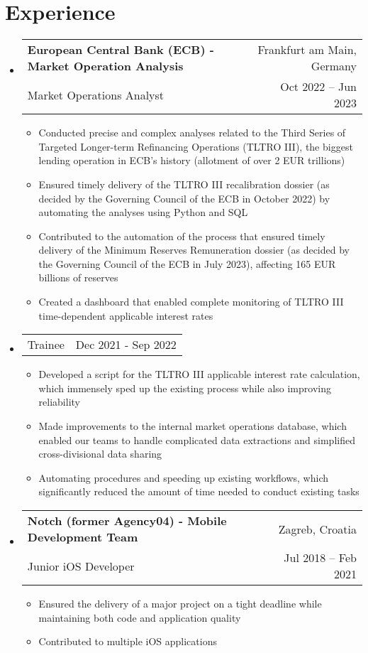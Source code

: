 \documentclass[letterpaper,11pt]{article}
\makeatletter
\newcommand{\resumeItem}[1]{
  \item\small{
    {#1 \vspace{-2pt}}
  }
}
\newcommand{\resumeSubheading}[4]{
  \vspace{-2pt}\item
    \begin{tabular*}{0.97\textwidth}[t]{l@{\extracolsep{\fill}}r}
      \textbf{#1} & #2 \\
      \small #3 & \small #4 \\
    \end{tabular*}\vspace{-7pt}
}
\newcommand{\resumeSubSubheading}[2]{
    \item
    \begin{tabular*}{0.97\textwidth}{l@{\extracolsep{\fill}}r}
      \small#1 & \small #2 \\
    \end{tabular*}\vspace{-7pt}
}
\newcommand{\resumeSubHeadingListStart}{\begin{itemize}[leftmargin=0.15in, label={}]}
\newcommand{\resumeSubHeadingListEnd}{\end{itemize}}
\newcommand{\resumeItemListStart}{\begin{itemize}}
\newcommand{\resumeItemListEnd}{\end{itemize}\vspace{-5pt}}
\makeatother
\begin{document}
\section{Experience}
  \resumeSubHeadingListStart

    \resumeSubheading
      {European Central Bank (ECB) - Market Operation Analysis}{Frankfurt am Main, Germany}
      {Market Operations Analyst}{Oct 2022 -- Jun 2023}
      \resumeItemListStart
        \resumeItem{Conducted precise and complex analyses related to the Third Series of Targeted Longer-term Refinancing Operations (TLTRO III), the biggest lending operation in ECB's history (allotment of over 2 EUR trillions)}
        \resumeItem{Ensured timely delivery of the TLTRO III recalibration dossier (as decided by the Governing Council of the ECB in October 2022) by automating the analyses using Python and SQL}
        \resumeItem{Contributed to the automation of the process that ensured timely delivery of the Minimum Reserves Remuneration dossier (as decided by the Governing Council of the ECB in July 2023), affecting 165 EUR billions of reserves}
        \resumeItem{Created a dashboard that enabled complete monitoring of TLTRO III time-dependent applicable interest rates}
      \resumeItemListEnd

   \resumeSubSubheading
    {Trainee}{Dec 2021 - Sep 2022}
    \resumeItemListStart
       \resumeItem{Developed a script for the TLTRO III applicable interest rate calculation, which immensely sped up the existing process while also improving reliability}
       \resumeItem{Made improvements to the internal market operations database, which enabled our teams to handle complicated data extractions and simplified cross-divisional data sharing}
       \resumeItem{Automating procedures and speeding up existing workflows, which significantly reduced the amount of time needed to conduct existing tasks}
    \resumeItemListEnd

   \resumeSubheading
      {Notch (former Agency04) - Mobile Development Team}{Zagreb, Croatia}
      {Junior iOS Developer}{Jul 2018 -- Feb 2021}
      \resumeItemListStart
        \resumeItem{Ensured the delivery of a major project on a tight deadline while maintaining both code and application quality}
        \resumeItem{Contributed to multiple iOS applications}
      \resumeItemListEnd

  \resumeSubHeadingListEnd 
\end{document}
